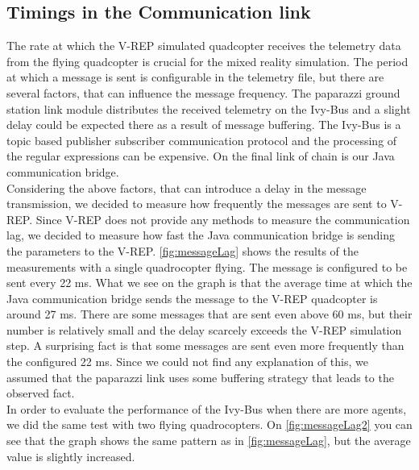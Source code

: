 
\subsection{Timings in the Communication link}
\label{sec:commTiming}



The rate at which the V-REP simulated quadcopter receives the telemetry data from the flying quadcopter is crucial for the mixed reality simulation. The period at which a message is sent is configurable in the telemetry file, but there are several factors, that can influence the message frequency. The paparazzi ground station link module distributes the received telemetry on the Ivy-Bus and a slight delay could be expected there as a result of message buffering. The Ivy-Bus is a topic based publisher subscriber communication protocol and the processing of the regular expressions can be expensive. On the final link of chain is our Java communication bridge.\\

Considering the above factors, that can introduce a delay in the message transmission, we decided to measure how frequently the messages are sent to V-REP. Since V-REP does not provide any methods to measure the communication lag, we decided to measure how fast the Java communication bridge is sending the parameters to the V-REP. \ref{fig:messageLag} shows the results of the measurements with a single quadrocopter flying. The message is configured to be sent every 22 ms. What we see on the graph is that the average time at which the Java communication bridge sends the message to the V-REP quadcopter is around 27 ms. There are some messages that are sent even above 60 ms, but their number is relatively small and the delay scarcely exceeds the V-REP simulation step. A surprising fact is that some messages are sent even more frequently than the configured 22 ms. Since we could not find any explanation of this, we assumed that the paparazzi link uses some buffering strategy that leads to the observed fact. \\
In order to evaluate the performance of the Ivy-Bus when there are more agents, we did the same test with two flying quadrocopters. On \ref{fig:messageLag2} you can see that the graph shows the same pattern as in \ref{fig:messageLag}, but the average value is slightly increased.\\

